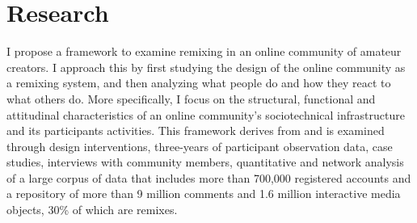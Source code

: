 \chapter{Research}

I propose a framework to examine remixing in an online community of amateur creators. 
I approach this by first studying the design of the online community as a remixing system, and then analyzing what people do and how they react to what others do.
More specifically, I focus on the structural, functional and attitudinal characteristics of an online community's sociotechnical infrastructure and its participants activities.
This framework derives from and is examined through design interventions, three-years of participant observation data, case studies, interviews with community members, quantitative and network analysis of a large corpus of data that includes more than 700,000 registered accounts and a repository of more than 9 million comments and 1.6 million interactive media objects, 30\% of which are remixes.







